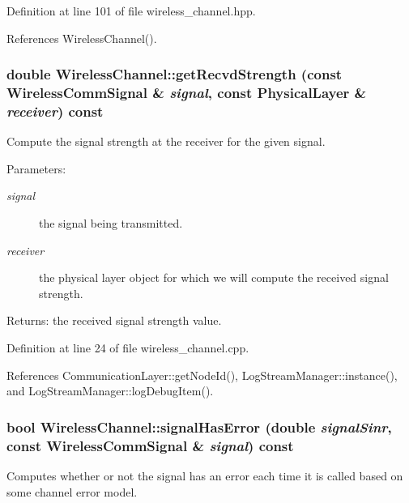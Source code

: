 Definition at line 101 of file wireless\_\-channel.hpp.

References Wireless\-Channel().
\subsubsection{\setlength{\rightskip}{0pt plus 5cm}double Wireless\-Channel::get\-Recvd\-Strength (const \bf{Wireless\-Comm\-Signal} \& {\em signal}, const \bf{Physical\-Layer} \& {\em receiver}) const\hspace{0.3cm}{\tt  [virtual]}}\label{classWirelessChannel_962a8c978b3ba7f86d5e4c6c06b4c2cf}


Compute the signal strength at the receiver for the given signal. 

\begin{Desc}
\item[Parameters:]
\begin{description}
\item[{\em signal}]the signal being transmitted. \item[{\em receiver}]the physical layer object for which we will compute the received signal strength. \end{description}
\end{Desc}
\begin{Desc}
\item[Returns:]the received signal strength value. \end{Desc}


Definition at line 24 of file wireless\_\-channel.cpp.

References Communication\-Layer::get\-Node\-Id(), Log\-Stream\-Manager::instance(), and Log\-Stream\-Manager::log\-Debug\-Item().
\subsubsection{\setlength{\rightskip}{0pt plus 5cm}bool Wireless\-Channel::signal\-Has\-Error (double {\em signal\-Sinr}, const \bf{Wireless\-Comm\-Signal} \& {\em signal}) const\hspace{0.3cm}{\tt  [virtual]}}\label{classWirelessChannel_ddd5107833915f0997864a635b34fc5c}


Computes whether or not the signal has an error each time it is called based on some channel error model. 

